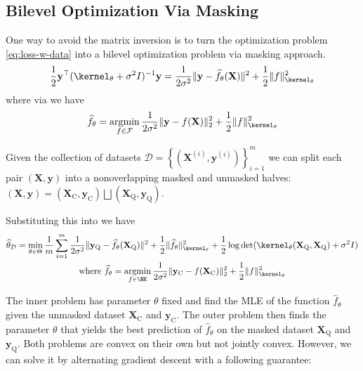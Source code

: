 \documentclass{article}
\newcommand{\nfunctions}{{m}}
\begin{document}
\subsection{Bilevel Optimization Via Masking}\label{sec:masking}
One way to avoid the matrix inversion is to turn the optimization problem \eqref{eq:loss-w-data} into a bilevel optimization problem via masking approach.
\begin{align*}
	\frac{1}{2} \mathbf{y}^\top (\kernel_\theta + \sigma^2 I)^{-1} \mathbf{y}
	= \frac{1}{2\sigma^2} \|\mathbf{y} - \hat{f}_\theta(\mathbf{X})\|^2
	+
	\frac{1}{2} \| f \|_{\kernel_\theta}^2
\end{align*}
where via  we have
\begin{align*}
	\hat{f}_\theta =
	\argmin_{f \in \ffam}
	\frac{1}{2\sigma^2} \|\mathbf{y} - f(\mathbf{X})\|_2^2 + \frac{1}{2} \| f \|_{\kernel_\theta}^2
\end{align*}


Given the collection of datasets $\mathcal{D} = \left\{\left(\mathbf{X}^{(i)}, \mathbf{y}^{(i)}\right)\right\}_{i=1}^{\nfunctions}$ we can split each pair $\left(\mathbf{X}, \mathbf{y}\right)$ into a nonoverlapping masked and unmasked halves: $\left(\mathbf{X}, \mathbf{y}\right) = \left(\mathbf{X}_{\text{C}}, \mathbf{y}_{\text{C}}\right) \bigsqcup \left(\mathbf{X}_{\text{Q}}, \mathbf{y}_{\text{Q}}\right)$.

Substituting this into  we have
\begin{gather*}
	\hat \theta_{\dataset} =
	\min_{\theta \in \Theta}
	\frac{1}{\nfunctions} \sum_{i=1}^\nfunctions
	\frac{1}{2\sigma^2} \|\mathbf{y}_{\text{Q}} - \hat{f}_\theta(\mathbf{X}_{\text{Q}})\|^2
	+
	\frac{1}{2} \| \hat{f}_\theta \|_{\kernel_\theta}^2
	+
	\frac{1}{2} \log \det(\kernel_\theta(\mathbf{X}_{\text{Q}}, \mathbf{X}_{\text{Q}}) + \sigma^2 I)
	\nonumber
	\\
	\text{where }
	\hat{f}_\theta =
	\argmin_{f \in \HK}
	\frac{1}{2\sigma^2} \|\mathbf{y}_{\text{C}} - f(\mathbf{X}_{\text{C}})\|_2^2 + \frac{1}{2} \| f \|_{\kernel_\theta}^2
\end{gather*}

The inner problem has parameter $\theta$ fixed and find the MLE of the function $\hat f_\theta$ given the unmasked dataset $\mathbf{X}_{\text{C}}$ and $\mathbf{y}_{\text{C}}$. The outer problem then finds the parameter $\theta$ that yields the best prediction of $\hat f_\theta$ on the masked dataset $\mathbf{X}_{\text{Q}}$ and $\mathbf{y}_{\text{Q}}$. Both problems are convex on their own but not jointly convex. However, we can solve it by alternating gradient descent with a following guarantee:
\begin{theorem}
\end{theorem}
\end{document}
